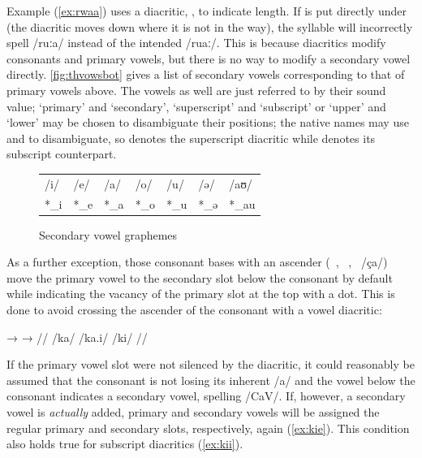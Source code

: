 Example (\ref{ex:rwaa}) uses a diacritic, , to indicate length. If 
 is put directly under  (the  diacritic moves
down where it is not in the way), the syllable will incorrectly spell /ruːa/
instead of the intended /ruaː/. This is because diacritics modify consonants
and primary vowels, but there is no way to modify a secondary vowel directly.
\autoref{fig:thvowsbot} gives a list of secondary vowels corresponding to that
of primary vowels above. The vowels as well are just referred to by their sound
value; `primary' and `secondary', `superscript' and `subscript' or `upper' and
`lower' may be chosen to disambiguate their positions; the native names may use
 and  to disambiguate, so  denotes the superscript  diacritic while  denotes its subscript counterpart.

\begin{figure}[t]
\caption{Secondary vowel graphemes}

\begin{tabu} to \linewidth{X[c] X[c] X[c] X[c] X[c] X[c] X[c]}
\toprule
\tableheaderfont	/i/ & /e/ & /a/ & /o/ & /u/ & /ə/ & /aʊ/ \\
\rowfont{\Tagati\huge}	*\_i & *\_e & *\_a & *\_o & *\_u & *\_ə & *\_au \\

\bottomrule
\end{tabu}
\label{fig:thvowsbot}
\end{figure}

As a further exception, those consonant bases with an ascender 
(~, ~, ~/ça/) move the primary vowel to 
the secondary slot below the consonant by default while indicating the vacancy 
of the primary slot at the top with a dot. This is done to avoid crossing the 
ascender of the consonant with a vowel diacritic:

\ex[lingstyle=thex]\begingl
	\gla {}	→		→	 //
	\glb /ka/	{}	/ka.i/		{}	/ki/ //
\endgl\xe

If the primary vowel slot were not silenced by the  diacritic, it 
could reasonably be assumed that the consonant is not losing its inherent /a/ 
and the vowel below the consonant indicates a secondary vowel, spelling /CaV/. 
If, however, a secondary vowel is \emph{actually} added, primary and secondary 
vowels will be assigned the regular primary and secondary slots, respectively, 
again (\ref{ex:kie}). This condition also holds true for subscript diacritics 
(\ref{ex:kii}).

